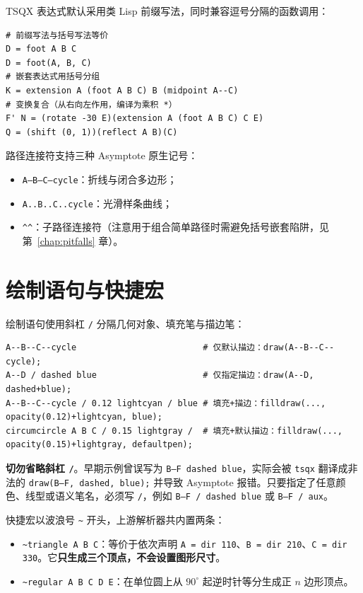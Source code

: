 \documentclass[11pt,oneside,fontset=none]{ctexbook}
\newcommand{\code}[1]{\texttt{#1}}
\begin{document}
TSQX 表达式默认采用类 Lisp 前缀写法，同时兼容逗号分隔的函数调用：
\begin{lstlisting}[language={}]
# 前缀写法与括号写法等价
D = foot A B C
D = foot(A, B, C)
# 嵌套表达式用括号分组
K = extension A (foot A B C) B (midpoint A--C)
# 变换复合（从右向左作用，编译为乘积 *）
F' N = (rotate -30 E)(extension A (foot A B C) C E)
Q = (shift (0, 1))(reflect A B)(C)
\end{lstlisting}

路径连接符支持三种 Asymptote 原生记号：
\begin{itemize}
  \item \code{A--B--C--cycle}：折线与闭合多边形；
  \item \code{A..B..C..cycle}：光滑样条曲线；
  \item \code{\textasciicircum\textasciicircum}：子路径连接符（注意用于组合简单路径时需避免括号嵌套陷阱，见第~\ref{chap:pitfalls} 章）。
\end{itemize}

\section{绘制语句与快捷宏}

绘制语句使用斜杠 \code{/} 分隔几何对象、填充笔与描边笔：
\begin{lstlisting}[language={}]
A--B--C--cycle                         # 仅默认描边：draw(A--B--C--cycle);
A--D / dashed blue                     # 仅指定描边：draw(A--D, dashed+blue);
A--B--C--cycle / 0.12 lightcyan / blue # 填充+描边：filldraw(..., opacity(0.12)+lightcyan, blue);
circumcircle A B C / 0.15 lightgray /  # 填充+默认描边：filldraw(..., opacity(0.15)+lightgray, defaultpen);
\end{lstlisting}

\begin{warnbox}
\textbf{切勿省略斜杠 \code{/}}。早期示例曾误写为 \code{B--F dashed blue}，实际会被 \code{tsqx} 翻译成非法的 \code{draw(B--F, dashed, blue);} 并导致 Asymptote 报错。只要指定了任意颜色、线型或语义笔名，必须写 \code{/}，例如 \code{B--F / dashed blue} 或 \code{B--F / aux}。
\end{warnbox}

快捷宏以波浪号 \code{\~{}} 开头，上游解析器共内置两条：
\begin{itemize}
  \item \code{\~{}triangle A B C}：等价于依次声明 \code{A = dir 110}、\code{B = dir 210}、\code{C = dir 330}。它\textbf{只生成三个顶点，不会设置图形尺寸}。
  \item \code{\~{}regular A B C D E}：在单位圆上从 \(90^\circ\) 起逆时针等分生成正 \(n\) 边形顶点。
\end{itemize}
\end{document}
